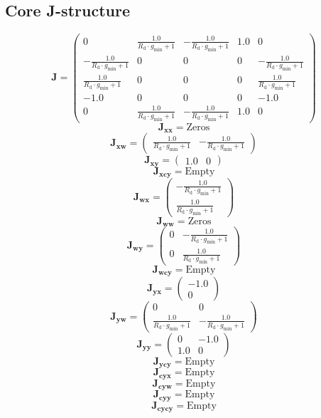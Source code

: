 \documentclass[11pt, oneside]{article}      %
\begin{document}
\subsection{Core J-structure}
%
$$ \mathbf{J} = \left(\begin{array}{ccccc}0 & \frac{1.0}{R_{\mathrm{d}} \cdot g_{\mathrm{min}} + 1} & - \frac{1.0}{R_{\mathrm{d}} \cdot g_{\mathrm{min}} + 1} & 1.0 & 0\\- \frac{1.0}{R_{\mathrm{d}} \cdot g_{\mathrm{min}} + 1} & 0 & 0 & 0 & - \frac{1.0}{R_{\mathrm{d}} \cdot g_{\mathrm{min}} + 1}\\\frac{1.0}{R_{\mathrm{d}} \cdot g_{\mathrm{min}} + 1} & 0 & 0 & 0 & \frac{1.0}{R_{\mathrm{d}} \cdot g_{\mathrm{min}} + 1}\\-1.0 & 0 & 0 & 0 & -1.0\\0 & \frac{1.0}{R_{\mathrm{d}} \cdot g_{\mathrm{min}} + 1} & - \frac{1.0}{R_{\mathrm{d}} \cdot g_{\mathrm{min}} + 1} & 1.0 & 0\end{array}\right)$$
%
$$ \mathbf{J_{xx}} = \mathrm{Zeros}$$
%
$$ \mathbf{J_{xw}} = \left(\begin{array}{cc}\frac{1.0}{R_{\mathrm{d}} \cdot g_{\mathrm{min}} + 1} & - \frac{1.0}{R_{\mathrm{d}} \cdot g_{\mathrm{min}} + 1}\end{array}\right)$$
%
$$ \mathbf{J_{xy}} = \left(\begin{array}{cc}1.0 & 0\end{array}\right)$$
%
$$ \mathbf{J_{xcy}} = \mathrm{Empty}$$
%
$$ \mathbf{J_{wx}} = \left(\begin{array}{c}- \frac{1.0}{R_{\mathrm{d}} \cdot g_{\mathrm{min}} + 1}\\\frac{1.0}{R_{\mathrm{d}} \cdot g_{\mathrm{min}} + 1}\end{array}\right)$$
%
$$ \mathbf{J_{ww}} = \mathrm{Zeros}$$
%
$$ \mathbf{J_{wy}} = \left(\begin{array}{cc}0 & - \frac{1.0}{R_{\mathrm{d}} \cdot g_{\mathrm{min}} + 1}\\0 & \frac{1.0}{R_{\mathrm{d}} \cdot g_{\mathrm{min}} + 1}\end{array}\right)$$
%
$$ \mathbf{J_{wcy}} = \mathrm{Empty}$$
%
$$ \mathbf{J_{yx}} = \left(\begin{array}{c}-1.0\\0\end{array}\right)$$
%
$$ \mathbf{J_{yw}} = \left(\begin{array}{cc}0 & 0\\\frac{1.0}{R_{\mathrm{d}} \cdot g_{\mathrm{min}} + 1} & - \frac{1.0}{R_{\mathrm{d}} \cdot g_{\mathrm{min}} + 1}\end{array}\right)$$
%
$$ \mathbf{J_{yy}} = \left(\begin{array}{cc}0 & -1.0\\1.0 & 0\end{array}\right)$$
%
$$ \mathbf{J_{ycy}} = \mathrm{Empty}$$
%
$$ \mathbf{J_{cyx}} = \mathrm{Empty}$$
%
$$ \mathbf{J_{cyw}} = \mathrm{Empty}$$
%
$$ \mathbf{J_{cyy}} = \mathrm{Empty}$$
%
$$ \mathbf{J_{cycy}} = \mathrm{Empty}$$
%
\end{document}
